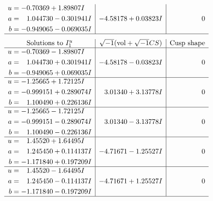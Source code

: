 \documentclass[1p]{elsarticle_modified}
\theoremstyle{definition}
\newcommand{\I}{\sqrt{-1}}
\begin{document}
$$\begin{array}{c|c|c}
\begin{aligned}
u &= -0.70369 + 1.89807 I \\
a &= \phantom{-}1.044730 - 0.301941 I \\
b &= -0.949065 - 0.069035 I\end{aligned}
 & -4.58178 + 0.03823 I & \phantom{-0.000000 } 0\\
 \hline 
 \end{array}$$\newpage$$\begin{array}{c|c|c}  
\text{Solutions to }I^u_{1}& \I (\text{vol} + \sqrt{-1}CS) & \text{Cusp shape}\\
 \hline 
\begin{aligned}
u &= -0.70369 - 1.89807 I \\
a &= \phantom{-}1.044730 + 0.301941 I \\
b &= -0.949065 + 0.069035 I\end{aligned}
 & -4.58178 - 0.03823 I & \phantom{-0.000000 } 0 \\ \hline\begin{aligned}
u &= -1.25665 + 1.72125 I \\
a &= -0.999151 + 0.289074 I \\
b &= \phantom{-}1.100490 + 0.226136 I\end{aligned}
 & \phantom{-}3.01340 + 3.13778 I & \phantom{-0.000000 } 0 \\ \hline\begin{aligned}
u &= -1.25665 - 1.72125 I \\
a &= -0.999151 - 0.289074 I \\
b &= \phantom{-}1.100490 - 0.226136 I\end{aligned}
 & \phantom{-}3.01340 - 3.13778 I & \phantom{-0.000000 } 0 \\ \hline\begin{aligned}
u &= \phantom{-}1.45520 + 1.64495 I \\
a &= \phantom{-}1.245450 + 0.114137 I \\
b &= -1.171840 + 0.197209 I\end{aligned}
 & -4.71671 - 1.25527 I & \phantom{-0.000000 } 0 \\ \hline\begin{aligned}
u &= \phantom{-}1.45520 - 1.64495 I \\
a &= \phantom{-}1.245450 - 0.114137 I \\
b &= -1.171840 - 0.197209 I\end{aligned}
 & -4.71671 + 1.25527 I & \phantom{-0.000000 } 0\\
 \hline 
 \end{array}$$\newpage\newpage\renewcommand{\arraystretch}{1}
\end{document}
